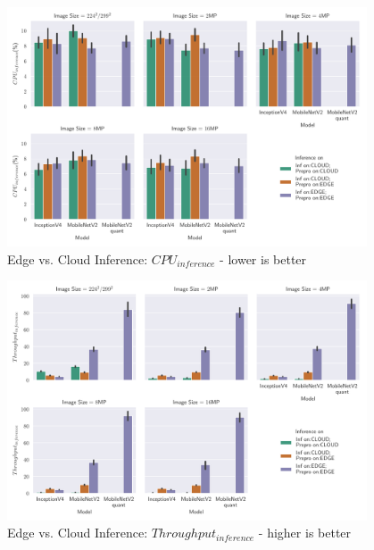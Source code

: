 \begin{figure}[!htb]
\centering
\includegraphics[width=0.95\textwidth]{./Bilder/single_plots/edge_vs_cloud_plots/Edge_vs_Cloud_Inference_Inference_CPU.pdf}
\caption{Edge vs. Cloud Inference:  $CPU_{inference}$ - lower is better}
\label{fig:EdgeVsCloudInferenceCPU}
\end{figure}


\begin{figure}[!htb]
\centering
\includegraphics[width=0.95\textwidth]{./Bilder/single_plots/edge_vs_cloud_plots/Edge_vs_Cloud_Inference_Throughput_without_Preprocessing.pdf}
\caption{Edge vs. Cloud Inference:  $Throughput_{inference}$ - higher is better}
\label{fig:EdgeVsCloudinferneceThroughput}
\end{figure}

